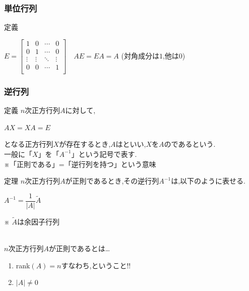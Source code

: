 \documentclass[a4paper]{jsarticle}
\begin{document}
\subsubsection{単位行列}
\begin{itembox}[l]{定義}
    \begin{center}
        $E=
            \begin{bmatrix}
                1      & 0      & \cdots & 0      \\
                0      & 1      & \cdots & 0      \\
                \vdots & \vdots & \ddots & \vdots \\
                0      & 0      & \cdots & 1      \\
            \end{bmatrix}
            \quad AE=EA=A
        $
        \quad(対角成分は$1$,他は$0$)
    \end{center}
\end{itembox}
\subsubsection{逆行列}
\begin{itembox}[l]{定義}
    $n$次正方行列$A$に対して,
    \begin{center}
        $AX=XA=E$
    \end{center}
    となる正方行列$X$が存在するとき,$A$はといい,$X$を$A$のであるという.\\
    一般に「$X$」を「$A^{-1}$」という記号で表す.\\
    ※「正則である」=「逆行列を持つ」という意味
\end{itembox}
\begin{itembox}[l]{定理}
    $n$次正方行列$A$が正則であるとき,その逆行列$A^{-1}$は,以下のように表せる.
    \begin{center}
        $A^{-1}=\dfrac{1}{|A|}\tilde{A}$
    \end{center}
    ※ $\tilde{A}$は余因子行列
\end{itembox}
\\
$n$次正方行列$A$が正則であるとは\dots
\begin{enumerate}[(1)]
    \item rank$\left(A\right)=n$\quad すなわち,ということ!!
    \item $\left|A\right|\neq0$
\end{enumerate}
\end{document}

